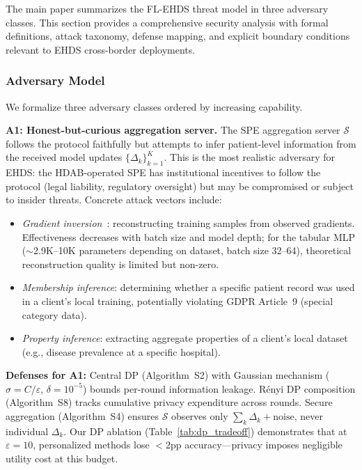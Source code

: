 \documentclass[conference]{IEEEtran}
\begin{document}
The main paper summarizes the FL-EHDS threat model in three adversary classes. This section provides a comprehensive security analysis with formal definitions, attack taxonomy, defense mapping, and explicit boundary conditions relevant to EHDS cross-border deployments.

\subsubsection{Adversary Model}

We formalize three adversary classes ordered by increasing capability.

\textbf{A1: Honest-but-curious aggregation server.} The SPE aggregation server $\mathcal{S}$ follows the protocol faithfully but attempts to infer patient-level information from the received model updates $\{\Delta_k\}_{k=1}^{K}$. This is the most realistic adversary for EHDS: the HDAB-operated SPE has institutional incentives to follow the protocol (legal liability, regulatory oversight) but may be compromised or subject to insider threats. Concrete attack vectors include:
\begin{itemize}
    \item \textit{Gradient inversion}~\cite{zhu2019deep}: reconstructing training samples from observed gradients. Effectiveness decreases with batch size and model depth; for the tabular MLP ($\sim$2.9K--10K parameters depending on dataset, batch size 32--64), theoretical reconstruction quality is limited but non-zero.
    \item \textit{Membership inference}: determining whether a specific patient record was used in a client's local training, potentially violating GDPR Article~9 (special category data).
    \item \textit{Property inference}: extracting aggregate properties of a client's local dataset (e.g., disease prevalence at a specific hospital).
\end{itemize}

\textbf{Defenses for A1:} Central DP (Algorithm~S2) with Gaussian mechanism ($\sigma = C/\varepsilon$, $\delta = 10^{-5}$) bounds per-round information leakage. R\'enyi DP composition (Algorithm~S8) tracks cumulative privacy expenditure across rounds. Secure aggregation (Algorithm~S4) ensures $\mathcal{S}$ observes only $\sum_k \Delta_k + \text{noise}$, never individual $\Delta_k$. Our DP ablation (Table~\ref{tab:dp_tradeoff}) demonstrates that at $\varepsilon = 10$, personalized methods lose $<$2pp accuracy---privacy imposes negligible utility cost at this budget.
\end{document}
